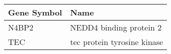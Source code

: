 \begin{tabular}{ll}
\toprule
Gene Symbol &                        Name \\
\midrule
      N4BP2 &     NEDD4 binding protein 2 \\
        TEC & tec protein tyrosine kinase \\
\bottomrule
\end{tabular}
